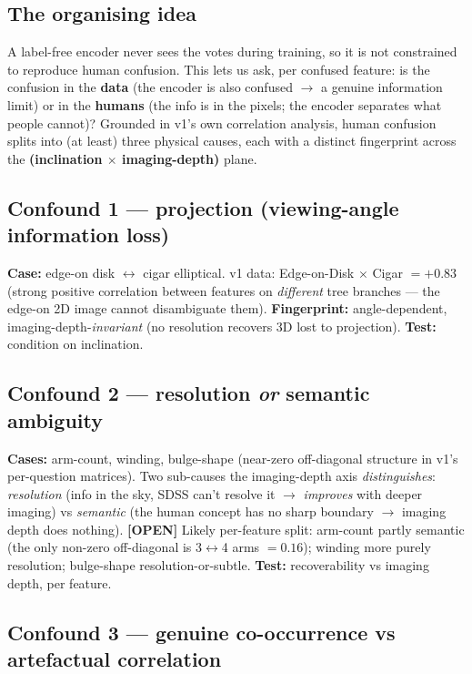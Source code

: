 \documentclass[11pt,a4paper]{article}
\newcommand{\opn}{\textcolor{openq}{\sffamily\bfseries[OPEN]}}
\begin{document}
\subsection{The organising idea}

A label-free encoder never sees the votes during training, so it is not constrained to
reproduce human confusion. This lets us ask, per confused feature: is the confusion in the
\textbf{data} (the encoder is also confused $\rightarrow$ a genuine information limit) or in the
\textbf{humans} (the info is in the pixels; the encoder separates what people cannot)? Grounded
in v1's own correlation analysis, human confusion splits into (at least) three physical causes,
each with a distinct fingerprint across the \textbf{(inclination $\times$ imaging-depth)} plane.

\subsection{Confound 1 --- projection (viewing-angle information loss)}

\textbf{Case:} edge-on disk $\leftrightarrow$ cigar elliptical. v1 data: Edge-on-Disk
$\times$ Cigar $= +0.83$ (strong positive correlation between features on \emph{different} tree
branches --- the edge-on 2D image cannot disambiguate them). \textbf{Fingerprint:}
angle-dependent, imaging-depth-\emph{invariant} (no resolution recovers 3D lost to projection).
\textbf{Test:} condition on inclination.

\subsection{Confound 2 --- resolution \emph{or} semantic ambiguity}

\textbf{Cases:} arm-count, winding, bulge-shape (near-zero off-diagonal structure in v1's
per-question matrices). Two sub-causes the imaging-depth axis \emph{distinguishes}:
\emph{resolution} (info in the sky, SDSS can't resolve it $\rightarrow$ \emph{improves} with
deeper imaging) vs \emph{semantic} (the human concept has no sharp boundary $\rightarrow$
imaging depth does nothing). \opn{} Likely per-feature split: arm-count partly semantic
(the only non-zero off-diagonal is 3$\leftrightarrow$4 arms $= 0.16$); winding more purely
resolution; bulge-shape resolution-or-subtle. \textbf{Test:} recoverability vs imaging depth,
per feature.

\subsection{Confound 3 --- genuine co-occurrence vs artefactual correlation}
\end{document}
